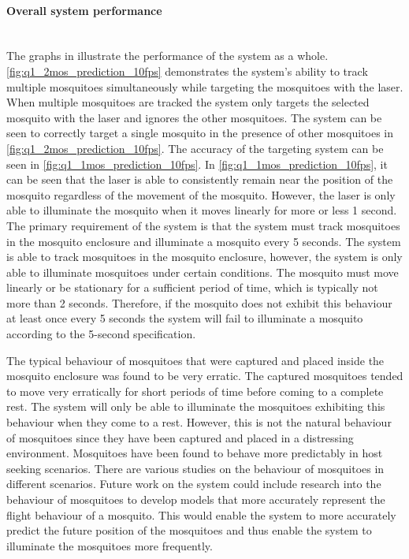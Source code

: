\paragraph{Overall system performance}\hfill\\
The graphs in  illustrate the performance of the system as a whole. \autoref{fig:q1_2mos_prediction_10fps} demonstrates the system's ability to track multiple mosquitoes simultaneously while targeting the mosquitoes with the laser. When multiple mosquitoes are tracked the system only targets the selected mosquito with the laser and ignores the other mosquitoes. The system can be seen to correctly target a single mosquito in the presence of other mosquitoes in \autoref{fig:q1_2mos_prediction_10fps}. The accuracy of the targeting system can be seen in \autoref{fig:q1_1mos_prediction_10fps}. In \autoref{fig:q1_1mos_prediction_10fps}, it can be seen that the laser is able to consistently remain near the position of the mosquito regardless of the movement of the mosquito. However, the laser is only able to illuminate the mosquito when it moves linearly for more or less 1 second. The primary requirement of the system is that the system must track mosquitoes in the mosquito enclosure and illuminate a mosquito every 5 seconds. The system is able to track mosquitoes in the mosquito enclosure, however, the system is only able to illuminate mosquitoes under certain conditions. The mosquito must move linearly or be stationary for a sufficient period of time, which is typically not more than 2 seconds. Therefore, if the mosquito does not exhibit this behaviour at least once every 5 seconds the system will fail to illuminate a mosquito according to the 5-second specification.

The typical behaviour of mosquitoes that were captured and placed inside the mosquito enclosure was found to be very erratic. The captured mosquitoes tended to move very erratically for short periods of time before coming to a complete rest. The system will only be able to illuminate the mosquitoes exhibiting this behaviour when they come to a rest. However, this is not the natural behaviour of mosquitoes since they have been captured and placed in a distressing environment. Mosquitoes have been found to behave more predictably in host seeking scenarios. There are various studies on the behaviour of mosquitoes in different scenarios. Future work on the system could include research into the behaviour of mosquitoes to develop models that more accurately represent the flight behaviour of a mosquito. This would enable the system to more accurately predict the future position of the mosquitoes and thus enable the system to illuminate the mosquitoes more frequently.


